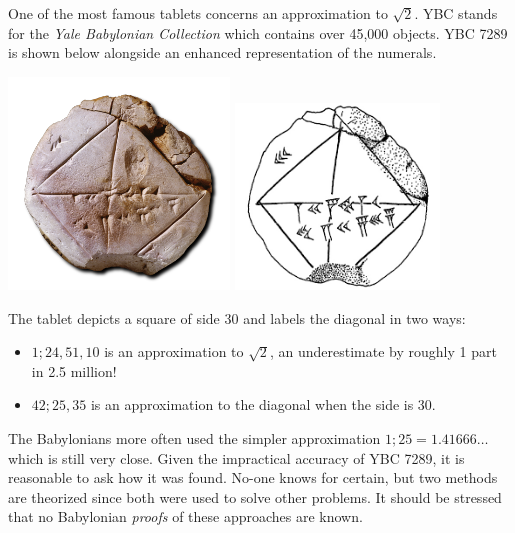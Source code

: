 One of the most famous tablets concerns an approximation to $\sqrt 2$. YBC stands for the \emph{Yale Babylonian Collection} which contains over 45,000 objects. YBC 7289 is shown below alongside an enhanced representation of the numerals.
\begin{center}
	\includegraphics[height=160pt]{YBC7289.png}
	\qquad
	\includegraphics[height=140pt]{ybc.png}
\end{center}

The tablet depicts a square of side 30 and labels the diagonal in two ways:
\begin{itemize}\itemsep0pt
  \item $1;24,51,10$ is an approximation to $\sqrt 2$, an underestimate by roughly 1 part in 2.5 million!
  \item $42;25,35$ is an approximation to the diagonal when the side is 30.
\end{itemize}
The Babylonians more often used the simpler approximation $1;25=1.41666\ldots$ which is still very close. Given the impractical accuracy of YBC 7289, it is reasonable to ask how it was found. No-one knows for certain, but two methods are theorized since both were used to solve other problems. It should be stressed that no Babylonian \emph{proofs} of these approaches are known.

